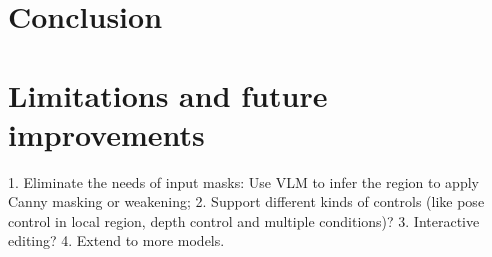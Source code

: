 \documentclass{article}
\begin{document}


\section{Conclusion}

\section{Limitations and future improvements}
\label{Sec:limitation}
1. Eliminate the needs of input masks: Use VLM to infer the region to apply Canny masking or weakening;
2. Support different kinds of controls (like pose control in local region, depth control and multiple conditions)? 
3. Interactive editing?
4. Extend to more models.









\end{document}
